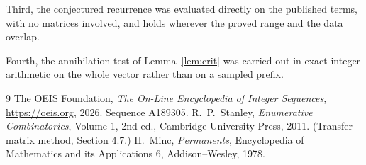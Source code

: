 \documentclass[11pt,a4paper]{article}
\theoremstyle{plain}
\theoremstyle{definition}
\begin{document}
Third, the conjectured recurrence was evaluated directly on the published terms, with no
matrices involved, and holds wherever the proved range and the data overlap.

Fourth, the annihilation test of Lemma~\ref{lem:crit} was carried out in exact integer
arithmetic on the whole vector rather than on a sampled prefix.

\begin{thebibliography}{9}
 The OEIS Foundation, \emph{The On-Line Encyclopedia of Integer
Sequences}, \url{https://oeis.org}, 2026. Sequence A189305.
 R.~P.~Stanley, \emph{Enumerative Combinatorics}, Volume 1, 2nd ed.,
Cambridge University Press, 2011. (Transfer-matrix method, Section 4.7.)
 H.~Minc, \emph{Permanents}, Encyclopedia of Mathematics and its
Applications 6, Addison--Wesley, 1978.
\end{thebibliography}
\end{document}
